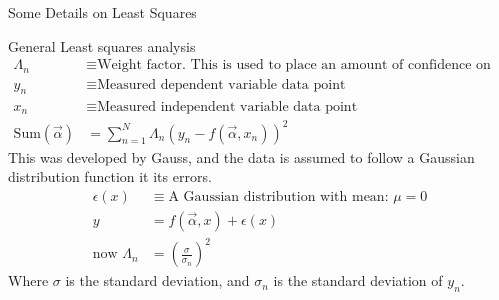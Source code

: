 \documentclass{article}
\begin{document}
\begin{section}{Some Details on Least Squares}
	\begin{subsection}{General Least squares analysis}
	\begin{align*}
		\Lambda_n &\equiv \text{Weight factor. This is used to place an amount of confidence on your data.}\\
		y_n &\equiv \text{Measured dependent variable data point}\\
		x_n &\equiv \text{Measured independent variable data point}\\
		\text{Sum}(\vec{\alpha}) &= \sum_{n=1}^{N}\Lambda_n (y_n - f(\vec{\alpha},x_n))^2
	\end{align*}
	This was developed by Gauss, and the data is assumed to follow a Gaussian distribution function it its errors.
	\begin{align*}
		\epsilon(x) &\equiv \text{A Gaussian distribution with mean: }\mu= 0\\
		y &= f(\vec{\alpha},x) + \epsilon(x)\\
		\text{now }\Lambda_n &= \left(\frac{\sigma}{\sigma_n}\right)^2
	\end{align*}
	Where $\sigma$ is the standard deviation, and $\sigma_n$ is the standard deviation of $y_n$.


\end{subsection}
\end{section}
\end{document}
